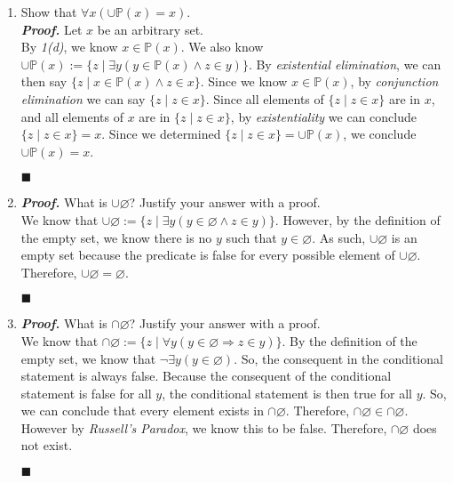 \documentclass[11pt,a4paper]{article}
\begin{document}
\begin{enumerate}
\begin{enumerate}
        \item 
        Show that $\forall x (\cup \mathbb{P} (x) = x) $. \\
        \emph{\textbf{Proof.}} Let $x $ be an arbitrary set. \\
        By \emph{1(d)}, we know $x \in \mathbb{P}(x) $. We also know $\cup \mathbb{P}(x) := \{z \mid \exists y (y \in \mathbb{P}(x) \land z \in y) \}$.
        By \emph{existential elimination}, we can then say $\{z \mid x \in \mathbb{P}(x) \land z \in x \} $. 
        Since we know $x \in \mathbb{P}(x) $, by \emph{conjunction elimination} we can say $\{z \mid z \in x \}  $.
        Since all elements of $\{z \mid z \in x \}  $ are in $x$, and all elements of $x$ are in $\{z \mid z \in x \}  $, by \emph{existentiality} we can conclude $\{z \mid z \in x \} = x $.
        Since we determined $\{z \mid z \in x \} = \cup \mathbb{P}(x) $, we conclude $\cup \mathbb{P}(x) = x $.
        \begin{flushright}
            $\blacksquare$
        \end{flushright}

        \item 
        \emph{\textbf{Proof.}} What is $\cup \varnothing $? Justify your answer with a proof. \\
        We know that $\cup \varnothing := \{z \mid \exists y (y \in \varnothing \land z \in y) \} $. 
        However, by the definition of the empty set, we know there is no $y$ such that $y \in \varnothing $. As such, $\cup \varnothing  $ is an empty set because the predicate is false for every possible element of $\cup \varnothing $. 
        Therefore, $\cup \varnothing = \varnothing $.   
        \begin{flushright}
            $\blacksquare$
        \end{flushright}
        
        \item 
        \emph{\textbf{Proof.}} What is $\cap \varnothing $? Justify your answer with a proof. \\
        We know that $\cap \varnothing := \{z \mid \forall y (y \in \varnothing \Rightarrow z \in y) \}  $. 
        By the definition of the empty set, we know that $\neg \exists y (y \in \varnothing) $. So, the consequent in the conditional statement is always false.
        Because the consequent of the conditional statement is false for all $y$, the conditional statement is then true for all $y$. So, we can conclude that every element exists in $\cap \varnothing$. Therefore, $\cap \varnothing \in \cap \varnothing $. 
        However by \emph{Russell's Paradox}, we know this to be false. Therefore, $\cap  \varnothing $ does not exist. 
        \begin{flushright}
            $\blacksquare$
        \end{flushright}


\end{enumerate}
\end{enumerate}
\end{document}
